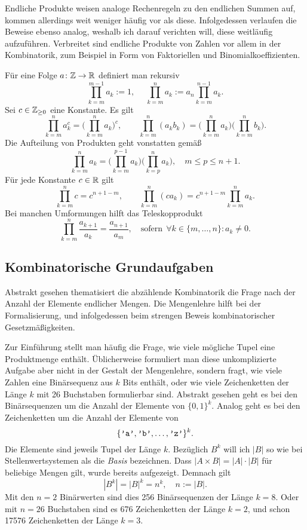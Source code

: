 Endliche Produkte weisen analoge Rechenregeln zu den endlichen Summen
auf, kommen allerdings weit weniger häufig vor als diese. Infolgedessen
verlaufen die Beweise ebenso analog, weshalb ich darauf verichten will,
diese weitläufig aufzuführen. Verbreitet sind endliche Produkte von
Zahlen vor allem in der Kombinatorik, zum Beispiel in Form von Faktoriellen
und Binomialkoeffizienten.

Für eine Folge $a\colon\mathbb Z\to\mathbb R$ definiert man rekursiv
\[\prod_{k=m}^{m-1} a_k := 1,\quad\;
\prod_{k=m}^n a_k := a_n\prod_{k=m}^{n-1} a_k.\]
Sei $c\in\mathbb Z_{\ge 0}$ eine Konstante. Es gilt
\[\prod_{k=m}^n a_k^c = \Big(\prod_{k=m}^n a_k\Big)^c,\qquad
\prod_{k=m}^n (a_k b_k) = \Big(\prod_{k=m}^n a_k\Big)\Big(\prod_{k=m}^n b_k\Big).\]
Die Aufteilung von Produkten geht vonstatten gemäß
\[\prod_{k=m}^n a_k = \Big(\prod_{k=m}^{p-1} a_k\Big)
\Big(\prod_{k=p}^n a_k\Big), \quad m\le p\le n+1.\]
Für jede Konstante $c\in\mathbb R$ gilt
\[\prod_{k=m}^n c = c^{n+1-m},\qquad
\prod_{k=m}^n (ca_k) = c^{n+1-m}\prod_{k=m}^n a_k.\]
Bei manchen Umformungen hilft das Teleskopprodukt
\[\prod_{k=m}^n\frac{a_{k+1}}{a_k} = \frac{a_{n+1}}{a_m},\quad
\text{sofern}\;\,\forall k\in\{m,\ldots,n\}\colon a_k\ne 0.\]

\subsection{Kombinatorische Grundaufgaben}

Abstrakt gesehen thematisiert die abzählende Kombinatorik die Frage
nach der Anzahl der Elemente endlicher Mengen. Die Mengenlehre
hilft bei der Formalisierung, und infolgedessen beim strengen Beweis
kombinatorischer Gesetzmäßigkeiten.

Zur Einführung stellt man häufig die Frage, wie viele mögliche Tupel
eine Produktmenge enthält. Üblicherweise formuliert man diese
unkomplizierte Aufgabe aber nicht in der Gestalt der Mengenlehre,
sondern fragt, wie viele Zahlen eine Binärsequenz aus $k$ Bits enthält,
oder wie viele Zeichenketten der Länge $k$ mit 26 Buchstaben
formulierbar sind. Abstrakt gesehen geht es bei den Binärsequenzen um
die Anzahl der Elemente von $\{0,1\}^k$. Analog geht es bei den
Zeichenketten um die Anzahl der Elemente von
\[\{\verb|'a'|,\verb|'b'|,\ldots,\verb|'z'|\}^k.\]
Die Elemente sind jeweils Tupel der Länge $k$. Bezüglich $B^k$ will
ich $|B|$ so wie bei Stellenwertsystemen als die \emph{Basis}
bezeichnen. Dass $|A\times B| = |A|\cdot |B|$ für beliebige Mengen
gilt, wurde bereits aufgezeigt. Demnach gilt
\[|B^k| = |B|^k = n^k, \quad n:=|B|.\]
Mit den $n=2$ Binärwerten sind dies 256 Binärsequenzen der Länge $k=8$.
Oder mit $n=26$ Buchstaben sind es 676 Zeichenketten der Länge $k=2$,
und schon 17576 Zeichenketten der Länge $k=3$.

